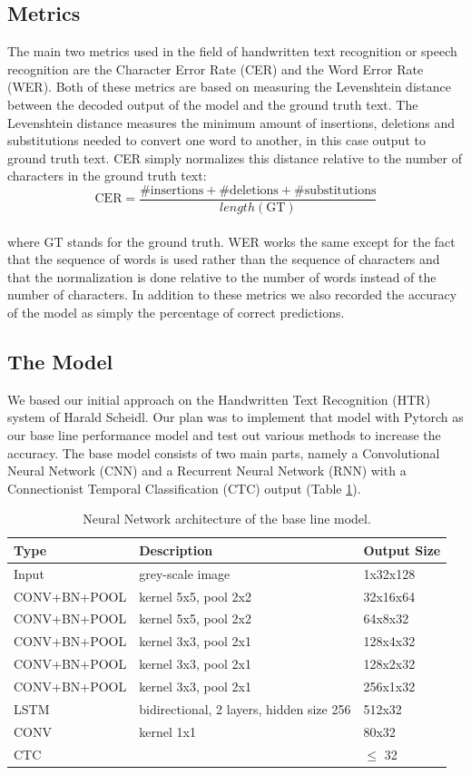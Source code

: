 \documentclass{article}
\begin{document}
\subsection{Metrics}
The main two metrics used in the field of handwritten text recognition or speech recognition are the Character Error Rate (CER) and the Word Error Rate (WER). Both of these metrics are based on measuring the Levenshtein distance between the decoded output of the model and the ground truth text. The Levenshtein distance measures the minimum amount of insertions, deletions and substitutions needed to convert one word to another, in this case output to ground truth text. CER simply normalizes this distance relative to the number of characters in the ground truth text:\\
\[
\text{CER} = \frac{\text{\#insertions}+\text{\#deletions}+\text{\#substitutions}}{length(\text{GT})}
\]\\ 
where GT stands for the ground truth. WER works the same except for the fact that the sequence of words is used rather than the sequence of characters and that the normalization is done relative to the number of words instead of the number of characters. In addition to these metrics we also recorded the accuracy of the model as simply the percentage of correct predictions.
\subsection{The Model}
We based our initial approach on the Handwritten Text Recognition (HTR) system of Harald Scheidl\cite{ScheidlHTR}\cite{ScheidlCTC}. Our plan was to implement that model with Pytorch as our base line performance model and test out various methods to increase the accuracy. The base model consists of two main parts, namely a Convolutional Neural Network (CNN) and a Recurrent Neural Network (RNN) with a Connectionist Temporal Classification (CTC) output (Table \ref{tab:SmallModel}).
\begin{table}[H]
\centering
\begin{tabular}{l|l|l}
Type & Description & Output Size \\ \hline
Input & grey-scale image & 1x32x128 \\ \hline
CONV+BN+POOL & kernel 5x5, pool 2x2 & 32x16x64 \\ \hline
CONV+BN+POOL & kernel 5x5, pool 2x2 & 64x8x32 \\ \hline
CONV+BN+POOL & kernel 3x3, pool 2x1 & 128x4x32 \\ \hline
CONV+BN+POOL & kernel 3x3, pool 2x1 & 128x2x32 \\ \hline
CONV+BN+POOL & kernel 3x3, pool 2x1 & 256x1x32 \\ \hline
LSTM         & bidirectional, 2 layers, hidden size 256 & 512x32 \\ \hline
CONV         & kernel 1x1 & 80x32 \\ \hline
CTC          &      & \(\leqslant\) 32 \\ \hline
\end{tabular}
\caption{Neural Network architecture of the base line model.}
\label{tab:SmallModel}
\end{table}
\end{document}
